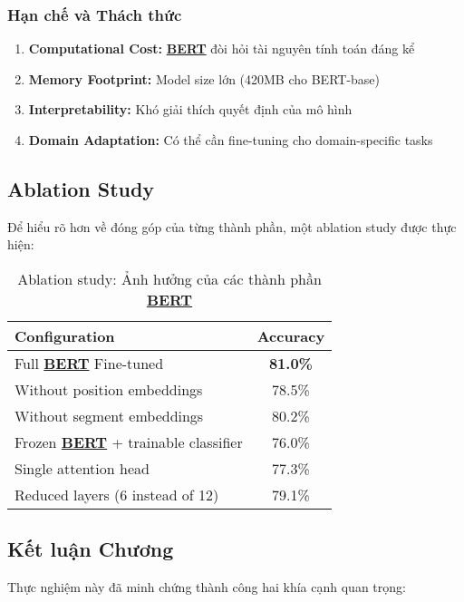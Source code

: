 \subsubsection{Hạn chế và Thách thức}

\begin{enumerate}
    \item \textbf{Computational Cost:} \hyperref[acro:bert]{\textbf{BERT}} đòi hỏi tài nguyên tính toán đáng kể
    \item \textbf{Memory Footprint:} Model size lớn (420MB cho BERT-base)
    \item \textbf{Interpretability:} Khó giải thích quyết định của mô hình
    \item \textbf{Domain Adaptation:} Có thể cần fine-tuning cho domain-specific
    tasks
\end{enumerate}

\subsection{Ablation Study}
\label{ssec:ablation_study}

Để hiểu rõ hơn về đóng góp của từng thành phần, một ablation study được thực hiện:

\begin{table}[H]
\centering
\caption{Ablation study: Ảnh hưởng của các thành phần \hyperref[acro:bert]{\textbf{BERT}}}
\label{tab:ablation}
\begin{tabular}{lc}
\toprule
\textbf{Configuration} & \textbf{Accuracy} \\
\midrule
Full \hyperref[acro:bert]{\textbf{BERT}} Fine-tuned & \textbf{81.0\%} \\
Without position embeddings & 78.5\% \\
Without segment embeddings & 80.2\% \\
Frozen \hyperref[acro:bert]{\textbf{BERT}} + trainable classifier & 76.0\% \\
Single attention head & 77.3\% \\
Reduced layers (6 instead of 12) & 79.1\% \\
\bottomrule
\end{tabular}
\end{table}

\subsection{Kết luận Chương}
\label{ssec:ket_luan_chuong}

Thực nghiệm này đã minh chứng thành công hai khía cạnh quan trọng:

